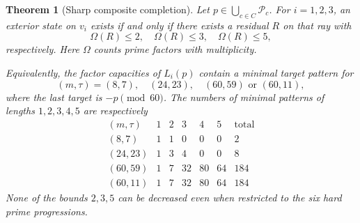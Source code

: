 \documentclass[11pt]{article}
\newtheorem{theorem}{Theorem}[section]
\theoremstyle{remark}\newtheorem{remark}[theorem]{Remark}
\newcommand{\Pcal}{\mathcal P}
\newcommand{\Om}{\Omega}
\begin{document}
\begin{theorem}[Sharp composite completion]\label{thm:235}
Let $p\in\bigcup_{c\in C}\Pcal_c$. For $i=1,2,3$, an exterior state on $v_i$ exists if and only if there exists a residual $R$ on that ray with
\[
 \Om(R)\le2,\quad\Om(R)\le3,\quad\Om(R)\le5,
\]
respectively. Here $\Om$ counts prime factors with multiplicity.

Equivalently, the factor capacities of $L_i(p)$ contain a minimal target pattern for
\[
 (m,\tau)=(8,7),\quad(24,23),\quad
 (60,59)\text{ or }(60,11),
\]
where the last target is $-p\pmod{60}$. The numbers of minimal patterns of lengths $1,2,3,4,5$ are respectively
\[
 \begin{array}{c|rrrrr|r}
 (m,\tau)&1&2&3&4&5&\text{total}\\\hline
 (8,7)&1&1&0&0&0&2\\
 (24,23)&1&3&4&0&0&8\\
 (60,59)&1&7&32&80&64&184\\
 (60,11)&1&7&32&80&64&184
 \end{array}
\]
None of the bounds $2,3,5$ can be decreased even when restricted to the six hard prime progressions.
\end{theorem}
\end{document}
